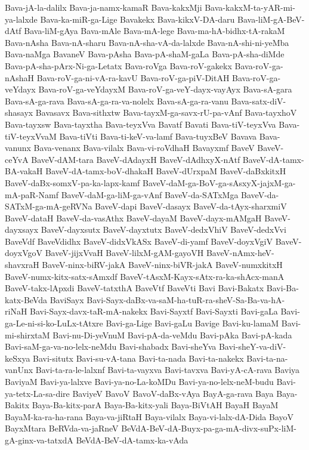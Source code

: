 {Bava-jA-la-dalilx
Bava-ja-namx-kamaR
Bava-kakxMji
Bava-kakxM-ta-yAR-mi-ya-lalxde
Bava-ka-miR-ga-Lige
Bavakekx
Bava-kikxV-DA-daru
Bava-liM-gA-BeV-dAtf
Bava-liM-gAya
Bava-mAle
Bava-mA-lege
Bava-ma-hA-bidhx-tA-rakaM
Bava-nAsha
Bava-nA-sharu
Bava-nA-sha-vA-da-lalxde
Bava-nA-shi-ni-yeMba
Bava-naMga
BavaneV
Bava-pAsha
Bava-pA-shaM-gaLa
Bava-pA-sha-diMde
Bava-pA-sha-pArx-Ni-ga-Letatx
Bava-roVga
Bava-roV-gakekx
Bava-roV-ga-nAshaH
Bava-roV-ga-ni-vA-ra-kavU
Bava-roV-ga-piV-DitAH
Bava-roV-ga-veYdayx
Bava-roV-ga-veYdayxM
Bava-roV-ga-veY-dayx-vayAyx
Bava-sA-gara
Bava-sA-ga-rava
Bava-sA-ga-ra-va-nolelx
Bava-sA-ga-ra-vanu
Bava-satx-diV-shasayx
Bavasavx
Bava-sithxtw
Bava-tayxM-ga-savx-rU-pa-vAnf
Bava-tayxhoV
Bava-tayxsw
Bava-tayxtha
Bava-teyxVva
Bavatf
Bavati
Bava-tiV-teyxVva
Bava-tiV-teyxVvaM
Bava-tiVti
Bava-ti-keV-va-lamf
Bava-tuyxBeV
Bavava
Bava-vanunx
Bava-venanx
Bava-vilalx
Bava-vi-roVdhaH
Bavayxmf
BaveV
BaveV-ceYvA
BaveV-dAM-tara
BaveV-dAdayxH
BaveV-dAdhxyX-nAtf
BaveV-dA-tamx-BA-vakaH
BaveV-dA-tamx-boV-dhakaH
BaveV-dUrxpaM
BaveV-daBxkitxH
BaveV-daBx-somxV-pa-ka-lapx-kamf
BaveV-daM-ga-BoV-ga-sAsxyX-jajxM-ga-mA-paR-Namf
BaveV-daM-ga-liM-ga-vAnf
BaveV-da-SATxMga
BaveV-da-SATxM-ga-mA-geRVNa
BaveV-dapi
BaveV-dasayx
BaveV-da-tAyx-sharxmiV
BaveV-dataH
BaveV-da-vasAthx
BaveV-dayaM
BaveV-dayx-mAMgaH
BaveV-dayxsayx
BaveV-dayxsutx
BaveV-dayxtutx
BaveV-dedxVhiV
BaveV-dedxVvi
BaveVdf
BaveVdidhx
BaveV-didxVkASx
BaveV-di-yamf
BaveV-doyxVgiV
BaveV-doyxVgoV
BaveV-jijxVvaH
BaveV-lilxM-gAM-gayoVH
BaveV-nAmx-heV-shavxraH
BaveV-ninx-biRV-jakA
BaveV-ninx-biVR-jakA
BaveV-numxkitxH
BaveV-numx-kitx-satx-sAmxdf
BaveV-tAsxM-Kayx-sAtx-ra-ka-shAcx-manA
BaveV-takx-lApxdi
BaveV-tatxthA
BaveVtf
BaveVti
Bavi
Bavi-Bakatx
Bavi-Ba-katx-BeVda
BaviSayx
Bavi-Sayx-daBx-va-saM-ha-tuR-ra-sheV-Sa-Ba-va-hA-riNaH
Bavi-Sayx-davx-taR-mA-nakekx
Bavi-Sayxtf
Bavi-Sayxti
Bavi-gaLa
Bavi-ga-Le-ni-si-ko-LuLx-tAtxre
Bavi-ga-Lige
Bavi-gaLu
Bavige
Bavi-ku-lamaM
Bavi-mi-shirxtaM
Bavi-nu-Di-yeVnuM
Bavi-pA-da-veMdu
Bavi-pAka
Bavi-pA-kada
Bavi-saM-ga-va-no-lelx-neMdu
Bavi-shabadx
Bavi-sheYva
Bavi-sheY-va-diV-keSxya
Bavi-situtx
Bavi-su-vA-tana
Bavi-ta-nada
Bavi-ta-nakekx
Bavi-ta-na-vanUnx
Bavi-ta-ra-le-lalxnf
Bavi-ta-vayxva
Bavi-tavxva
Bavi-yA-cA-rava
Baviya
BaviyaM
Bavi-ya-lalxve
Bavi-ya-no-La-koMDu
Bavi-ya-no-lelx-neM-budu
Bavi-ya-tetx-La-sa-dire
BaviyeV
BavoV
BavoV-daBx-vAya
BayA-ga-rava
Baya
Baya-Bakitx
Baya-Ba-kitx-parA
Baya-Ba-kitx-yali
Baya-BiVtAH
BayaH
BayaM
BayaM-ka-ra-ha-rana
Baya-va-jiRtaH
Baya-vilalx
Baya-vi-lalx-dA-Dida
BayoV
BayxMtara
BeRVda-va-jaRneV
BeVdA-BeV-dA-Buyx-pa-ga-mA-divx-suPx-liM-gA-ginx-va-tatxdA
BeVdA-BeV-dA-tamx-ka-vAda
}
